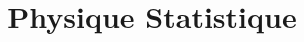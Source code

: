 \documentclass{article}
\begin{document}
\title{Physique Statistique}
\date{}
\maketitle
\tableofcontents
\end{document}
